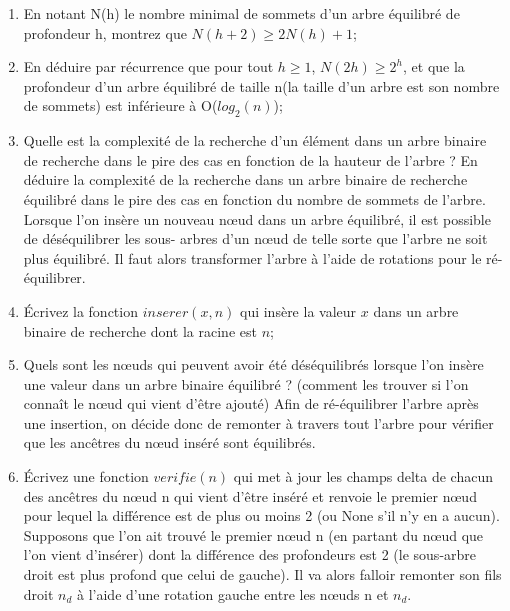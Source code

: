 \documentclass[10pt,a4paper]{article}
\begin{document}
\begin{enumerate}
    \item En notant N(h) le nombre minimal de sommets d’un arbre équilibré de profondeur h, montrez
que $N(h+ 2) \geq 2N(h) + 1$;
    \item En déduire par récurrence que pour tout $h \geq 1$, $ N(2h) \geq 2^h$, et que la profondeur d’un arbre
équilibré de taille n(la taille d’un arbre est son nombre de sommets) est inférieure à O($log_2(n)$);

    \item Quelle est la complexité de la recherche d’un élément dans un arbre binaire de recherche dans
le pire des cas en fonction de la hauteur de l’arbre ? En déduire la complexité de la recherche dans
un arbre binaire de recherche équilibré dans le pire des cas en fonction du nombre de sommets de
l’arbre.\\

Lorsque l’on insère un nouveau nœud dans un arbre équilibré, il est possible de déséquilibrer les sous-
arbres d’un nœud de telle sorte que l’arbre ne soit plus équilibré. Il faut alors transformer l’arbre à l’aide
de rotations pour le ré-équilibrer.\\

    \item Écrivez la fonction $inserer(x, n)$ qui insère la valeur $x$ dans un arbre binaire de recherche dont la racine est $n$;

    \item Quels sont les nœuds qui peuvent avoir été déséquilibrés lorsque l’on insère une valeur dans un
arbre binaire équilibré ? (comment les trouver si l’on connaît le nœud qui vient d’être ajouté)
Afin de ré-équilibrer l’arbre après une insertion, on décide donc de remonter à travers tout l’arbre pour
vérifier que les ancêtres du nœud inséré sont équilibrés.

    \item Écrivez une fonction $verifie(n)$ qui met à jour les champs delta de chacun des ancêtres du
nœud n qui vient d’être inséré et renvoie le premier nœud pour lequel la différence est de plus ou moins 2 (ou
None s’il n’y en a aucun).\\

Supposons que l’on ait trouvé le premier nœud n (en partant du nœud que l’on vient d’insérer) dont la
différence des profondeurs est 2 (le sous-arbre droit est plus profond que celui de gauche). Il va alors
falloir remonter son fils droit $n_d$ à l’aide d’une rotation gauche entre les nœuds n et $n_d$.\\


\end{enumerate}
\end{document}
